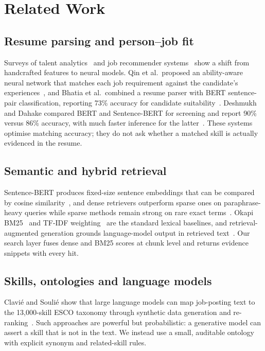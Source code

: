 \documentclass[conference]{IEEEtran}
\begin{document}
\section{Related Work}
\subsection{Resume parsing and person--job fit}
Surveys of talent analytics~\cite{qin_survey} and job recommender systems~\cite{ruijt} show a shift from handcrafted features to neural models. Qin et al.\ proposed an ability-aware neural network that matches each job requirement against the candidate's experiences~\cite{qin_pjf}, and Bhatia et al.\ combined a resume parser with BERT sentence-pair classification, reporting 73\% accuracy for candidate suitability~\cite{bhatia}. Deshmukh and Dahake compared BERT and Sentence-BERT for screening and report 90\% versus 86\% accuracy, with much faster inference for the latter~\cite{deshmukh}. These systems optimise matching accuracy; they do not ask whether a matched skill is actually evidenced in the resume.

\subsection{Semantic and hybrid retrieval}
Sentence-BERT produces fixed-size sentence embeddings that can be compared by cosine similarity~\cite{sbert}, and dense retrievers outperform sparse ones on paraphrase-heavy queries while sparse methods remain strong on rare exact terms~\cite{dpr}. Okapi BM25~\cite{bm25} and TF-IDF weighting~\cite{tfidf} are the standard lexical baselines, and retrieval-augmented generation grounds language-model output in retrieved text~\cite{rag}. Our search layer fuses dense and BM25 scores at chunk level and returns evidence snippets with every hit.

\subsection{Skills, ontologies and language models}
Clavi\'e and Souli\'e show that large language models can map job-posting text to the 13{,}000-skill ESCO taxonomy through synthetic data generation and re-ranking~\cite{clavie}. Such approaches are powerful but probabilistic: a generative model can assert a skill that is not in the text. We instead use a small, auditable ontology with explicit synonym and related-skill rules.
\end{document}
